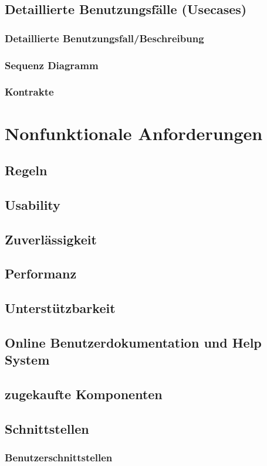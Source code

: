 \documentclass{article}
\begin{document}
\subsection{Detaillierte Benutzungsfälle (Usecases)}
\subsubsection{Detaillierte Benutzungsfall/Beschreibung}
\subsubsection{Sequenz Diagramm}
\subsubsection{Kontrakte}

\section{Nonfunktionale Anforderungen}
\subsection{Regeln}
\subsection{Usability}
\subsection{Zuverlässigkeit}
\subsection{Performanz}
\subsection{Unterstützbarkeit}
\subsection{Online Benutzerdokumentation und Help System}
\subsection{zugekaufte Komponenten}
\subsection{Schnittstellen}
\subsubsection{Benutzerschnittstellen}
\end{document}
